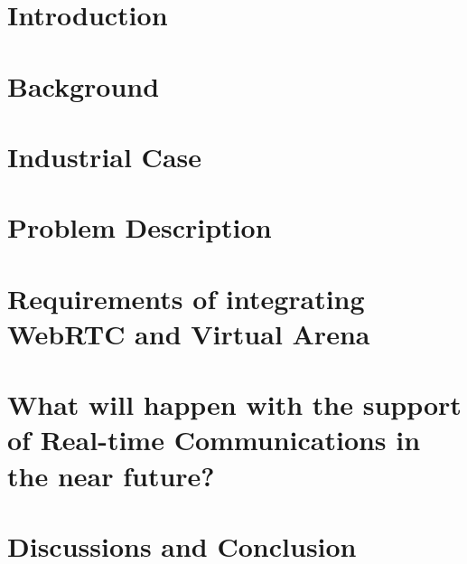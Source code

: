 \chapter{Introduction}


\chapter{Background}


%

%

\chapter{Industrial Case}


\chapter{Problem Description}




\chapter{Requirements of integrating WebRTC and Virtual Arena}
%


\chapter{What will happen with the support of Real-time Communications in the near future?}



\chapter{Discussions and Conclusion}
%